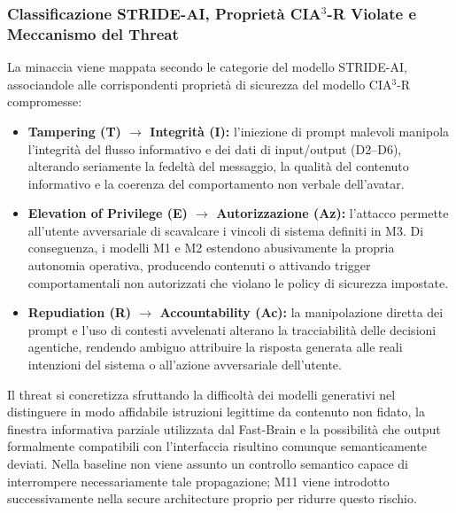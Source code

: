 \documentclass[11pt,a4paper]{article}
\begin{document}
\subsubsection{Classificazione STRIDE-AI, Proprietà CIA$^3$-R Violate e Meccanismo del Threat}

La minaccia viene mappata secondo le categorie del modello STRIDE-AI, associandole alle
corrispondenti proprietà di sicurezza del modello CIA$^3$-R compromesse:

\begin{itemize}
    \item \textbf{Tampering (T) $\to$ Integrità (I):} l'iniezione di prompt malevoli manipola
    l'integrità del flusso informativo e dei dati di input/output (D2--D6), alterando seriamente la
    fedeltà del messaggio, la qualità del contenuto informativo e la coerenza del comportamento non
    verbale dell'avatar.
    \item \textbf{Elevation of Privilege (E) $\to$ Autorizzazione (Az):} l'attacco permette
    all'utente avversariale di scavalcare i vincoli di sistema definiti in M3. Di conseguenza, i
    modelli M1 e M2 estendono abusivamente la propria autonomia operativa, producendo contenuti o
    attivando trigger comportamentali non autorizzati che violano le policy di sicurezza impostate.
    \item \textbf{Repudiation (R) $\to$ Accountability (Ac):} la manipolazione diretta dei prompt e
    l'uso di contesti avvelenati alterano la tracciabilità delle decisioni agentiche, rendendo
    ambiguo attribuire la risposta generata alle reali intenzioni del sistema o all'azione
    avversariale dell'utente.
\end{itemize}

Il threat si concretizza sfruttando la difficoltà dei modelli
generativi nel distinguere in modo affidabile istruzioni legittime da
contenuto non fidato, la finestra informativa parziale utilizzata dal
Fast-Brain e la possibilità che output formalmente compatibili con
l'interfaccia risultino comunque semanticamente deviati. Nella
baseline non viene assunto un controllo semantico capace di
interrompere necessariamente tale propagazione; M11 viene introdotto
successivamente nella secure architecture proprio per ridurre questo
rischio.

\end{document}
